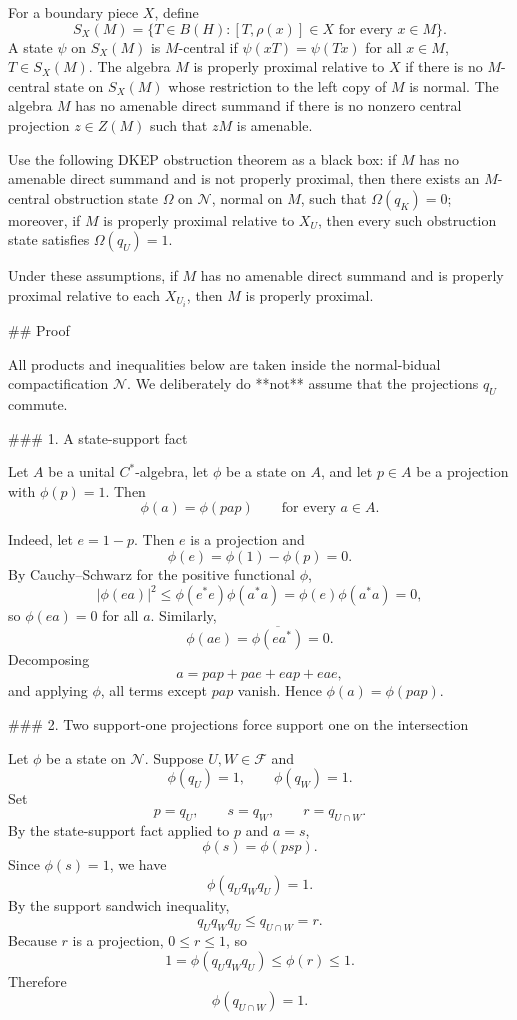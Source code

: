 For a boundary piece \(X\), define
\[
S_X(M)=\{T\in B(H):[T,\rho(x)]\in X\text{ for every }x\in M\}.
\]
A state \(\psi\) on \(S_X(M)\) is \(M\)-central if \(\psi(xT)=\psi(Tx)\) for all \(x\in M\), \(T\in S_X(M)\). The algebra \(M\) is properly proximal relative to \(X\) if there is no \(M\)-central state on \(S_X(M)\) whose restriction to the left copy of \(M\) is normal. The algebra \(M\) has no amenable direct summand if there is no nonzero central projection \(z\in Z(M)\) such that \(zM\) is amenable.

Use the following DKEP obstruction theorem as a black box: if \(M\) has no amenable direct summand and is not properly proximal, then there exists an \(M\)-central obstruction state \(\Omega\) on \(\mathcal N\), normal on \(M\), such that \(\Omega(q_K)=0\); moreover, if \(M\) is properly proximal relative to \(X_U\), then every such obstruction state satisfies \(\Omega(q_U)=1\).

Under these assumptions, if \(M\) has no amenable direct summand and is properly proximal relative to each \(X_{U_i}\), then \(M\) is properly proximal.

## Proof

All products and inequalities below are taken inside the normal-bidual compactification \(\mathcal N\). We deliberately do **not** assume that the projections \(q_U\) commute.

### 1. A state-support fact

Let \(A\) be a unital \(C^*\)-algebra, let \(\phi\) be a state on \(A\), and let \(p\in A\) be a projection with \(\phi(p)=1\). Then
\[
\phi(a)=\phi(pap)
\qquad\text{for every }a\in A.
\]

Indeed, let \(e=1-p\). Then \(e\) is a projection and
\[
\phi(e)=\phi(1)-\phi(p)=0.
\]
By Cauchy–Schwarz for the positive functional \(\phi\),
\[
|\phi(ea)|^2\le \phi(e^*e)\phi(a^*a)=\phi(e)\phi(a^*a)=0,
\]
so \(\phi(ea)=0\) for all \(a\). Similarly,
\[
\phi(ae)=\overline{\phi(ea^*)}=0.
\]
Decomposing
\[
a=pap+pae+eap+eae,
\]
and applying \(\phi\), all terms except \(pap\) vanish. Hence \(\phi(a)=\phi(pap)\).

### 2. Two support-one projections force support one on the intersection

Let \(\phi\) be a state on \(\mathcal N\). Suppose \(U,W\in\mathcal F\) and
\[
\phi(q_U)=1,\qquad \phi(q_W)=1.
\]
Set
\[
p=q_U,\qquad s=q_W,\qquad r=q_{U\cap W}.
\]
By the state-support fact applied to \(p\) and \(a=s\),
\[
\phi(s)=\phi(psp).
\]
Since \(\phi(s)=1\), we have
\[
\phi(q_Uq_Wq_U)=1.
\]
By the support sandwich inequality,
\[
q_Uq_Wq_U\le q_{U\cap W}=r.
\]
Because \(r\) is a projection, \(0\le r\le 1\), so
\[
1=\phi(q_Uq_Wq_U)\le \phi(r)\le 1.
\]
Therefore
\[
\phi(q_{U\cap W})=1.
\]

